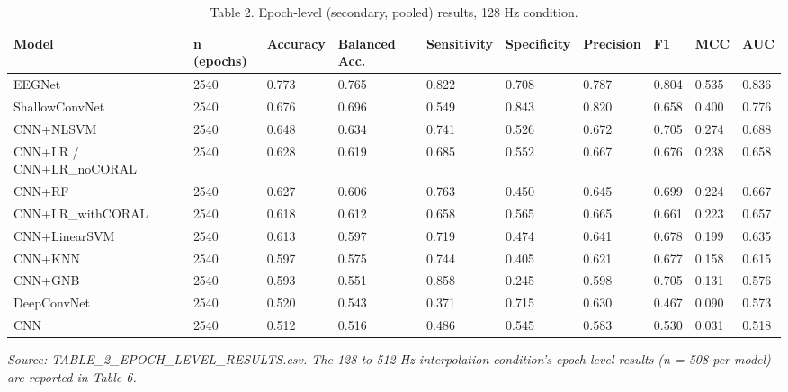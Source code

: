 \documentclass[a4paper,fleqn]{cas-sc}
\begin{document}
\begin{table}[htbp]
\centering
\small
\caption{Table 2. Epoch-level (secondary, pooled) results, 128 Hz condition.}
\begin{tabular}{llllllllll}
\toprule
Model & n (epochs) & Accuracy & Balanced Acc. & Sensitivity & Specificity & Precision & F1 & MCC & AUC \\
\midrule
EEGNet & 2540 & 0.773 & 0.765 & 0.822 & 0.708 & 0.787 & 0.804 & 0.535 & 0.836 \\
ShallowConvNet & 2540 & 0.676 & 0.696 & 0.549 & 0.843 & 0.820 & 0.658 & 0.400 & 0.776 \\
CNN+NLSVM & 2540 & 0.648 & 0.634 & 0.741 & 0.526 & 0.672 & 0.705 & 0.274 & 0.688 \\
CNN+LR / CNN+LR\_noCORAL & 2540 & 0.628 & 0.619 & 0.685 & 0.552 & 0.667 & 0.676 & 0.238 & 0.658 \\
CNN+RF & 2540 & 0.627 & 0.606 & 0.763 & 0.450 & 0.645 & 0.699 & 0.224 & 0.667 \\
CNN+LR\_withCORAL & 2540 & 0.618 & 0.612 & 0.658 & 0.565 & 0.665 & 0.661 & 0.223 & 0.657 \\
CNN+LinearSVM & 2540 & 0.613 & 0.597 & 0.719 & 0.474 & 0.641 & 0.678 & 0.199 & 0.635 \\
CNN+KNN & 2540 & 0.597 & 0.575 & 0.744 & 0.405 & 0.621 & 0.677 & 0.158 & 0.615 \\
CNN+GNB & 2540 & 0.593 & 0.551 & 0.858 & 0.245 & 0.598 & 0.705 & 0.131 & 0.576 \\
DeepConvNet & 2540 & 0.520 & 0.543 & 0.371 & 0.715 & 0.630 & 0.467 & 0.090 & 0.573 \\
CNN & 2540 & 0.512 & 0.516 & 0.486 & 0.545 & 0.583 & 0.530 & 0.031 & 0.518 \\
\bottomrule
\end{tabular}
\end{table}

\textit{Source: TABLE\_2\_EPOCH\_LEVEL\_RESULTS.csv. The 128-to-512 Hz interpolation condition's epoch-level results (n = 508 per model) are reported in Table 6.}
\end{document}
